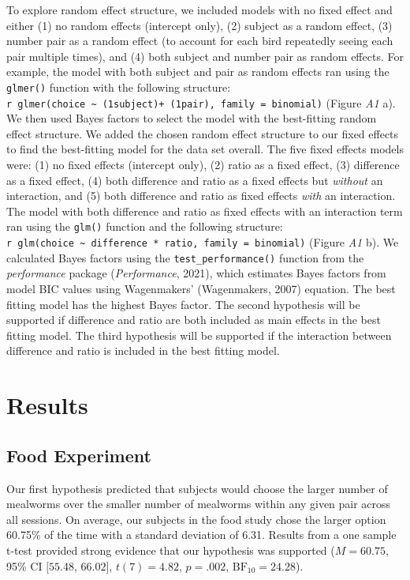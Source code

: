 \documentclass[
  english,
  ,doc,floatsintext]{apa6}
\begin{document}
To explore random effect structure, we included models with no fixed effect and either (1) no random effects (intercept only), (2) subject as a random effect, (3) number pair as a random effect (to account for each bird repeatedly seeing each pair multiple times), and (4) both subject and number pair as random effects. For example, the model with both subject and pair as random effects ran using the \texttt{glmer()} function with the following structure: \texttt{r\ glmer(choice\ \textasciitilde{}\ (1\textbar{}subject)+\ (1\textbar{}pair),\ family\ =\ binomial)} (Figure \emph{A1} a). We then used Bayes factors to select the model with the best-fitting random effect structure. We added the chosen random effect structure to our fixed effects to find the best-fitting model for the data set overall. The five fixed effects models were: (1) no fixed effects (intercept only), (2) ratio as a fixed effect, (3) difference as a fixed effect, (4) both difference and ratio as a fixed effects but \emph{without} an interaction, and (5) both difference and ratio as fixed effects \emph{with} an interaction. The model with both difference and ratio as fixed effects with an interaction term ran using the \texttt{glm()} function and the following structure: \texttt{r\ glm(choice\ \textasciitilde{}\ difference\ *\ ratio,\ family\ =\ binomial)} (Figure \emph{A1} b). We calculated Bayes factors using the \texttt{test\_performance()} function from the \emph{performance} package (\emph{Performance}, 2021), which estimates Bayes factors from model BIC values using Wagenmakers' (Wagenmakers, 2007) equation. The best fitting model has the highest Bayes factor. The second hypothesis will be supported if difference and ratio are both included as main effects in the best fitting model. The third hypothesis will be supported if the interaction between difference and ratio is included in the best fitting model.

\hypertarget{results}{%
\section{Results}\label{results}}

\hypertarget{food-experiment-1}{%
\subsection{Food Experiment}\label{food-experiment-1}}

Our first hypothesis predicted that subjects would choose the larger number of mealworms over the smaller number of mealworms within any given pair across all sessions. On average, our subjects in the food study chose the larger option 60.75\% of the time with a standard deviation of 6.31. Results from a one sample t-test provided strong evidence that our hypothesis was supported (\(M = 60.75\), 95\% CI \([55.48\), \(66.02]\), \(t(7) = 4.82\), \(p = .002\), \(\mathrm{BF}_{\textrm{10}} = 24.28\)).
\end{document}
